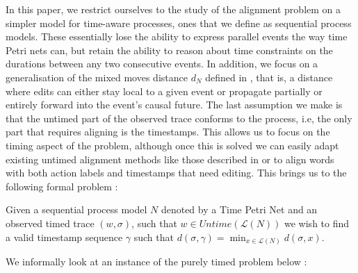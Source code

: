 \documentclass[runningheads]{llncs}
\begin{document}
	In this paper, we restrict ourselves to the study of the alignment problem on a simpler model for time-aware processes, ones that we define as sequential process models. These essentially lose the ability to express parallel events the way time Petri nets can, but retain the ability to reason about time constraints on the durations between any two consecutive events. In addition, we focus on a generalisation of the mixed moves distance $d_N$ defined in \cite{CR22}, that is, a distance where edits can either stay local to a given event or propagate partially or entirely forward into the event's causal future. The last assumption we make is that the untimed part of the observed trace conforms to the process, i.e, the only part that requires aligning is the timestamps. This allows us to focus on the timing aspect of the problem, although once this is solved we can easily adapt existing untimed alignment methods like those described in \cite{Adriansyah2014AligningOA} or \cite{BCC21} to align words with both action labels and timestamps that need editing. This brings us to the following formal problem : 
	
	\begin{definition}
		Given a sequential process model $N$ denoted by a Time Petri Net and an observed timed trace $(w, \sigma)$, such that $w \in Untime(\mathcal{L}(N))$ we wish to find a valid timestamp sequence $\gamma$ such that $d(\sigma, \gamma) = \min_{x \in \mathcal{L}(N)} d(\sigma, x)$.
	\end{definition}
	
	We informally look at an instance of the purely timed problem below : 
	
\end{document}

